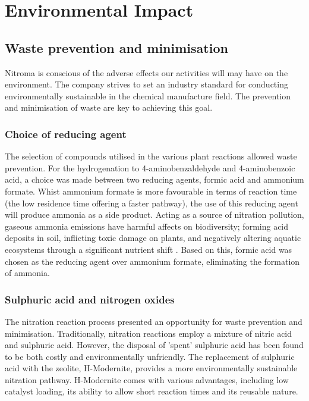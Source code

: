 \section{Environmental Impact}

\subsection{Waste prevention and minimisation}

Nitroma is conscious of the adverse effects our activities will may have on the environment. The company strives to set an industry standard for conducting environmentally sustainable in the chemical manufacture field. The prevention and minimisation of waste are key to achieving this goal. 

\subsubsection{Choice of reducing agent}
The selection of compounds utilised in the various plant reactions allowed waste prevention. For the hydrogenation to 4-aminobenzaldehyde and 4-aminobenzoic acid, a choice was made between two reducing agents, formic acid and ammonium formate. Whist ammonium formate is more favourable in terms of reaction time (the low residence time offering a faster pathway), the use of this reducing agent will produce ammonia as a side product. Acting as a  source of nitration pollution, gaseous ammonia emissions have harmful affects on biodiversity; forming acid deposits in soil, inflicting toxic damage on plants, and negatively altering aquatic ecosystems through a significant nutrient shift \cite{european_environment_agency_ammonia_2019}. Based on this, formic acid was chosen as the reducing agent over ammonium formate, eliminating the formation of ammonia. 

\subsubsection{Sulphuric acid and nitrogen oxides}
The nitration reaction process presented an opportunity for waste prevention and minimisation. Traditionally, nitration reactions employ a mixture of nitric acid and sulphuric acid. However, the disposal of 'spent' sulphuric acid has been found to be both costly and environmentally unfriendly. The replacement of sulphuric acid with the zeolite, H-Modernite, provides a more environmentally sustainable nitration pathway. H-Modernite comes with various advantages, including low catalyst loading, its ability to allow short reaction times and its reusable nature. 

